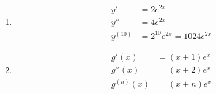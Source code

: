 \begin{enumerate}
    \item
          \begin{align*}
              y'       & = 2e^{2x}                   \\
              y''      & = 4e^{2x}                   \\
              y^{(10)} & = 2^{10}e^{2x} = 1024e^{2x}
          \end{align*}

    \item
          \begin{align*}
              g'(x)      & =(x+1) e^x  \\
              g''(x)     & = (x+2) e^x \\
              g^{(n)}(x) & = (x+n)e^x
          \end{align*}
\end{enumerate}
\newpage